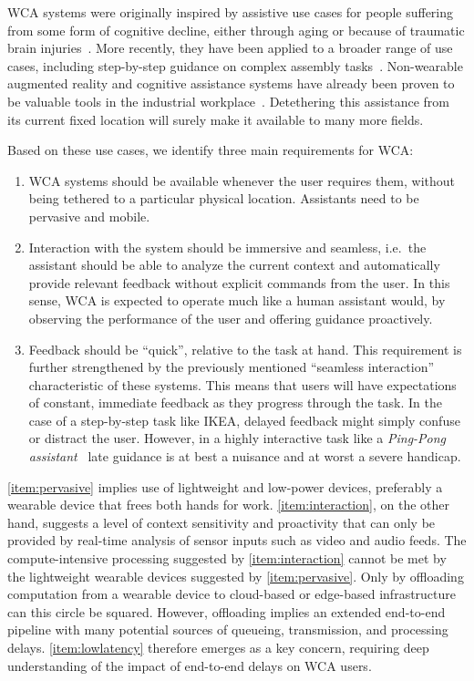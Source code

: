 \documentclass[10pt,letterpaper]{article}
\begin{document}
WCA systems were originally inspired by assistive use cases for people suffering from some form of cognitive decline, either through aging or because of traumatic brain injuries~\cite{Ha:TowardsWearableCogAssist,satya2019augmenting}.
More recently, they have been applied to a broader range of use cases, including step-by-step guidance on complex assembly tasks~\cite{Chen:AnEmpiricalStudyOfLatency}.
Non-wearable augmented reality and cognitive assistance systems have already been proven to be valuable tools in the industrial workplace~\cite{funk2015caworkplace,gorecky2011cognito}.
Detethering this assistance from its current fixed location will surely make it available to many more fields. 

Based on these use cases, we identify three main requirements for WCA:\@
\begin{enumerate}
    \item\label{item:pervasive} WCA systems should be available whenever the user requires them, without being tethered to a particular physical location. Assistants need to be pervasive and mobile.

    \item\label{item:interaction} Interaction with the system should be immersive and seamless, i.e.\ the assistant should be able to analyze the current context and automatically provide relevant feedback without explicit commands from the user.
    In this sense, WCA is expected to operate much like a human assistant would, by observing the performance of the user and offering guidance proactively.

    \item\label{item:lowlatency} Feedback should be ``quick'', relative to the task at hand. 
    This requirement is further strengthened by the previously mentioned ``seamless interaction'' characteristic of these systems.
    This means that users will have expectations of constant, immediate feedback as they progress through the task.
    In the case of a step-by-step task like IKEA, delayed feedback might simply confuse or distract the user.
    However, in a highly interactive task like a \emph{Ping-Pong assistant}~\cite{PingPongAssistant, Chen:EarlyImplementation} late guidance is at best a nuisance and at worst a severe handicap.
\end{enumerate}

\cref{item:pervasive} implies use of lightweight and low-power devices, preferably a wearable device that frees both hands for work.
\cref{item:interaction}, on the other hand, suggests a level of context sensitivity and proactivity that can only be provided by real-time analysis of sensor inputs such as video and audio feeds.
The compute-intensive processing suggested by \cref{item:interaction} cannot be met by the lightweight wearable devices suggested by \cref{item:pervasive}.
Only by offloading computation from a wearable device to cloud-based or edge-based infrastructure can this circle be squared.
However, offloading implies an extended end-to-end pipeline with many potential sources of queueing, transmission, and processing delays.
\cref{item:lowlatency} therefore emerges as a key concern, requiring deep understanding of the impact of end-to-end delays on WCA users.
\end{document}
